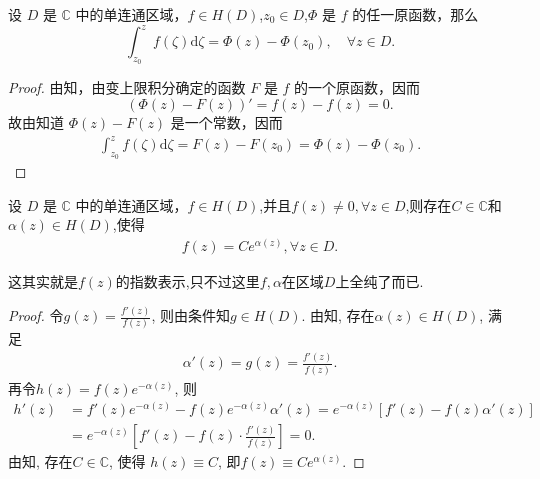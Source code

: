\documentclass[../../main.tex]{subfiles}%
\begin{document}
\begin{theorem}[复积分的微分学基本定理]\label{theorem:复积分的微分学基本定理}
设 \( D \) 是 \( \mathbb{C} \) 中的单连通区域，\( f \in H(D) \),$z_0\in D$,\( \Phi \) 是 \( f \) 的任一原函数，那么
\[
\int_{z_0}^{z} f(\zeta) \mathrm{d}\zeta  = \Phi(z) - \Phi(z_0),\quad \forall z\in D.
\]
\end{theorem}
\begin{proof}

由知，由变上限积分确定的函数 \( F \) 是 \( f \) 的一个原函数，因而
\[
(\Phi(z) - F(z))' = f(z) - f(z) = 0.
\]
故由知道 \( \Phi(z) - F(z) \) 是一个常数，因而
\begin{align*}
\int_{z_0}^{z} f(\zeta) \mathrm{d}\zeta  = F(z) - F(z_0) = \Phi(z) - \Phi(z_0).
\end{align*}

\end{proof}

\begin{proposition}\label{proposition:单连通区域内无零点的解析函数必为指数函数}
设 \( D \) 是 \( \mathbb{C} \) 中的单连通区域，\( f \in H(D) \),并且$f(z)\neq 0,\forall z\in D$,则存在$C\in \mathbb{C}$和$\alpha(z)\in H(D)$,使得
\begin{align*}
f(z)=Ce^{\alpha(z)},\forall z\in D.
\end{align*}
\end{proposition}
\begin{remark}
这其实就是$f(z)$的指数表示,只不过这里$f,\alpha$在区域$D$上全纯了而已.
\end{remark}
\begin{proof}

令$g\left( z \right) =\frac{f'\left( z \right)}{f\left( z \right)}$, 则由条件知$g\in H(D)$. 由知, 存在$\alpha \left( z \right)\in H(D)$, 满足
\begin{align*}
\alpha '\left( z \right) =g\left( z \right) =\frac{f'\left( z \right)}{f\left( z \right)}.
\end{align*}
再令$h\left( z \right) =f\left( z \right) e^{-\alpha \left( z \right)}$, 则
\begin{align*}
h'\left( z \right)&=f'\left( z \right) e^{-\alpha \left( z \right)}-f\left( z \right) e^{-\alpha \left( z \right)}\alpha '\left( z \right) =e^{-\alpha \left( z \right)}\left[ f'\left( z \right) -f\left( z \right) \alpha '\left( z \right) \right] \\
&=e^{-\alpha \left( z \right)}\left[ f'\left( z \right) -f\left( z \right) \cdot \frac{f'\left( z \right)}{f\left( z \right)} \right] =0.
\end{align*}
由知, 存在$C\in \mathbb{C}$, 使得
$h\left( z \right) \equiv C$, 即$f\left( z \right) \equiv Ce^{\alpha \left( z \right)}$.

\end{proof}
\end{document}
